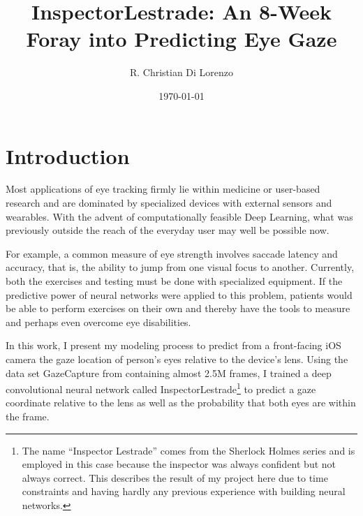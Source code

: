 \documentclass[aip, rsi, amsmath, amssymb, reprint, author-year, longbibliography]{revtex4-1}
\begin{document}

\title[InspectorLestrade: Predicting Eye Gaze]{InspectorLestrade: An 8-Week
  Foray into Predicting Eye Gaze}

\author{R. Christian Di Lorenzo}

\date{\today}%

\begin{abstract}
\end{abstract}

\maketitle

\section{\label{sec:level1}Introduction}

Most applications of eye tracking firmly lie within medicine or user-based
research and are dominated by specialized devices with external sensors and
wearables. With the advent of computationally feasible Deep Learning, what was
previously outside the reach of the everyday user may well be possible now.

For example, a common measure of eye strength involves saccade latency and
accuracy, that is, the ability to jump from one visual focus to another.
Currently, both the exercises and testing must be done with specialized
equipment. If the predictive power of neural networks were applied to this
problem, patients would be able to perform exercises on their own and thereby
have the tools to measure and perhaps even overcome eye disabilities.

In this work, I present my modeling process to predict from a front-facing iOS
camera the gaze location of person's eyes relative to the device's lens. Using
the data set GazeCapture from \cite{7780608} containing almost 2.5M frames, I
trained a deep convolutional neural network called
InspectorLestrade\footnote{The name ``Inspector Lestrade'' comes from the
  Sherlock Holmes series and is employed in this case because the inspector was
  always confident but not always correct. This describes the result of my
  project here due to time constraints and having hardly any previous
  experience with building neural networks.} to predict a gaze coordinate
relative to the lens as well as the probability that both eyes are within the
frame.
\end{document}
